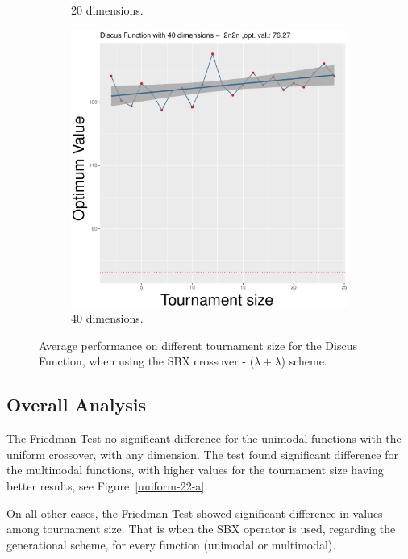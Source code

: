 \begin{figure}[t]
\begin{subfigure}[b]{0.33\textwidth}
		\caption{20 dimensions.}
	\end{subfigure}
	\begin{subfigure}[b]{0.33\textwidth}
		\centering
		\includegraphics[width=\textwidth]{img/2n2n-40D/unimodal_2n2n_11_dim_40.pdf}
		\caption{40 dimensions.}
	\end{subfigure}
	\caption{Average performance on different tournament size for the Discus Function, when using the SBX crossover - ($\lambda + \lambda$) scheme.}
	\label{sbx-11-B}
\end{figure}




\subsection{Overall Analysis}

The Friedman Test no significant difference for the unimodal functions with the uniform crossover, with any dimension. The test found significant difference for the multimodal functions, with higher values for the tournament size having better results, see Figure~\ref{uniform-22-a}.

On all other cases, the Friedman Test showed significant difference in values among tournament size. That is when the SBX operator is used, regarding the generational scheme, for every function (unimodal or multimodal).  


